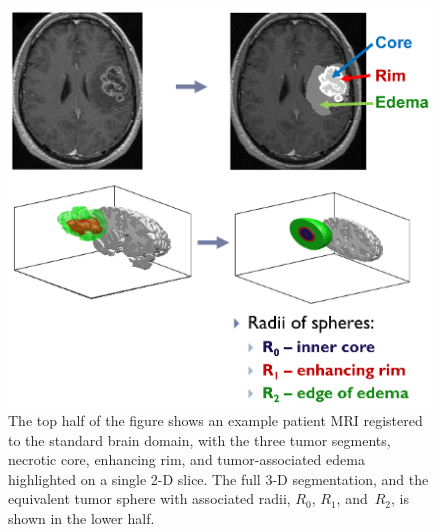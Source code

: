 \documentclass{aims}
\numberwithin{equation}{section}
\begin{document}
\begin{figure}
\begin{center}
\includegraphics[scale=0.81]{plots/radii_process.eps}
\end{center}
\caption{The top half of the figure shows an example patient MRI registered
to the standard brain domain, with the three tumor segments, necrotic core,
enhancing rim, and tumor-associated edema highlighted on a single 2-D slice.
The full 3-D segmentation, and the equivalent tumor sphere with associated
radii, $R_0$, $R_1$, and~$R_2$, is shown in the lower half.}
\label{fig:radii_process}
\end{figure}
\end{document}
